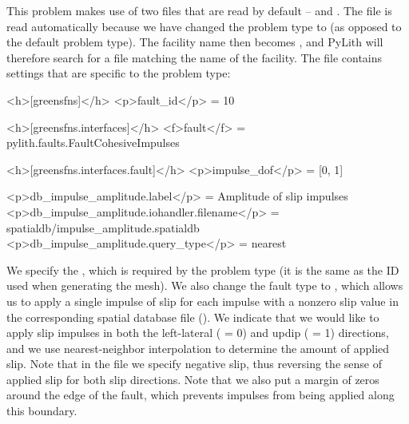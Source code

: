 This problem makes use of two  files that are read by
default --  and . The
 file is read automatically because we have
changed the problem type to  (as opposed to the
default  problem type). The facility name then
becomes , and PyLith will therefore search for a
 file matching the name of the facility. The
 file contains settings that are specific to
the  problem type:
\begin{cfg}
<h>[greensfns]</h>
<p>fault_id</p> = 10

<h>[greensfns.interfaces]</h>
<f>fault</f> = pylith.faults.FaultCohesiveImpulses

<h>[greensfns.interfaces.fault]</h>
<p>impulse_dof</p> = [0, 1]

<p>db_impulse_amplitude.label</p> = Amplitude of slip impulses
<p>db_impulse_amplitude.iohandler.filename</p> = spatialdb/impulse_amplitude.spatialdb
<p>db_impulse_amplitude.query_type</p> = nearest 
\end{cfg}
We specify the , which is required by the 
problem type (it is the same as the ID used when generating the mesh).
We also change the fault type to , which
allows us to apply a single impulse of slip for each impulse with
a nonzero slip value in the corresponding spatial database file
(). We indicate that
we would like to apply slip impulses in both the left-lateral (
= 0) and updip ( = 1) directions, and we use
nearest-neighbor interpolation to determine the amount of applied
slip. Note that in the 
file we specify negative slip, thus reversing the sense of applied
slip for both slip directions. Note that we also put a margin of zeros
around the edge of the fault, which prevents impulses from being applied
along this boundary.

